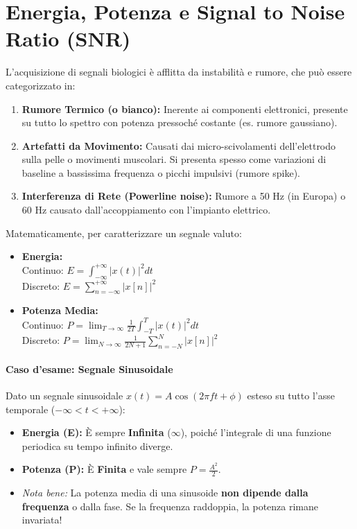 \section{Energia, Potenza e Signal to Noise Ratio (SNR)}
L'acquisizione di segnali biologici è afflitta da instabilità e rumore, che può essere categorizzato in:
\begin{enumerate}
    \item \textbf{Rumore Termico (o bianco):} Inerente ai componenti elettronici, presente su tutto lo spettro con potenza pressoché costante (es. rumore gaussiano).
    \item \textbf{Artefatti da Movimento:} Causati dai micro-scivolamenti dell'elettrodo sulla pelle o movimenti muscolari. Si presenta spesso come variazioni di baseline a bassissima frequenza o picchi impulsivi (rumore spike).
    \item \textbf{Interferenza di Rete (Powerline noise):} Rumore a 50 Hz (in Europa) o 60 Hz causato dall'accoppiamento con l'impianto elettrico.
\end{enumerate}

Matematicamente, per caratterizzare un segnale valuto:
\begin{itemize}
    \item \textbf{Energia:}
    \\ Continuo: $\displaystyle E = \int_{-\infty}^{+\infty} |x(t)|^2 dt$
    \\ Discreto: $\displaystyle E = \sum_{n=-\infty}^{+\infty} |x[n]|^2$
    \vspace{0.2cm}
    \item \textbf{Potenza Media:}
    \\ Continuo: $\displaystyle P = \lim_{T \to \infty} \frac{1}{2T} \int_{-T}^{T} |x(t)|^2 dt$
    \\ Discreto: $\displaystyle P = \lim_{N \to \infty} \frac{1}{2N+1} \sum_{n=-N}^{N} |x[n]|^2$
\end{itemize}

\paragraph{Caso d'esame: Segnale Sinusoidale}
Dato un segnale sinusoidale $x(t) = A \cos(2\pi f t + \phi)$ esteso su tutto l'asse temporale ($-\infty < t < +\infty$):
\begin{itemize}
    \item \textbf{Energia (E):} È sempre \textbf{Infinita} ($\infty$), poiché l'integrale di una funzione periodica su tempo infinito diverge.
    \item \textbf{Potenza (P):} È \textbf{Finita} e vale sempre $P = \frac{A^2}{2}$.
    \item \textit{Nota bene:} La potenza media di una sinusoide \textbf{non dipende dalla frequenza} o dalla fase. Se la frequenza raddoppia, la potenza rimane invariata!
\end{itemize}

